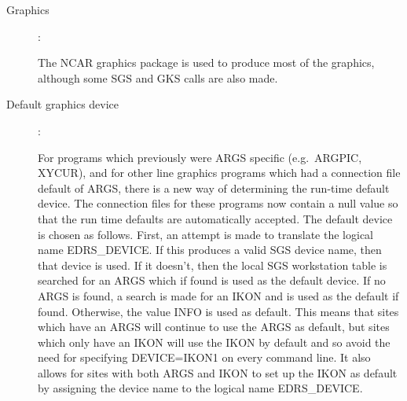\begin{description}
\item [Graphics]:

The NCAR graphics package is used to produce most of the graphics, although
some SGS and GKS calls are also made.

\item [Default graphics device]:

For programs which previously were ARGS specific (e.g.\ ARGPIC,  XYCUR), and
for other line graphics programs which had a connection file default of ARGS,
there is a new way of determining the run-time default device.
The connection files for these programs now contain a null value so that the
run time defaults are automatically accepted.
The default device is chosen  as follows.
First, an attempt is made to translate the logical name EDRS\_DEVICE.
If this produces a valid SGS device name, then that device is used.
If it doesn't, then the local SGS workstation table is searched for an ARGS 
which if found is used as the default device.
If no ARGS is found, a search is made for an IKON and is used as the default if
found.
Otherwise, the value INFO is used as default.
This means that sites which have an ARGS will continue to use the ARGS as
default, but sites which only have an IKON will use the IKON by default and so
avoid the need for specifying DEVICE=IKON1 on every command line.
It also allows for sites with both ARGS and IKON to set up the IKON as default
by assigning the device name to the logical name EDRS\_DEVICE.

\end{description}


